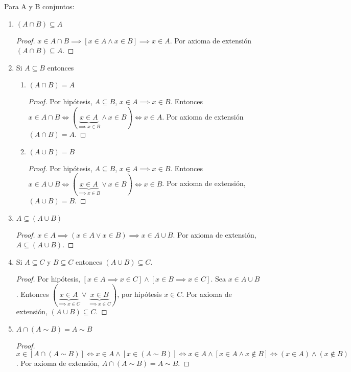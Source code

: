 





	
Para A y B conjuntos:
\begin{enumerate}
	\item $(A \cap B) \subseteq A$
	\begin{proof}
		$x\in A\cap B\implies [x\in A \wedge x \in B]\implies x\in A$. Por axioma de extensión $(A \cap B) \subseteq A$. 
	\end{proof}
	\item Si $A \subseteq B$ entonces 
	\begin{enumerate}
		\item  $(A \cap B)=A$
		\begin{proof}
			Por hipótesis, $A\subseteq B$, $x\in A\implies x\in B$. Entonces $x\in A\cap B\iff (\underbrace{x\in A}_{\implies x\in B} \wedge x \in B)\iff x\in A$. Por axioma de extensión $(A \cap B)=A$. 
		\end{proof}
		\item $(A \cup B)=B$
		\begin{proof}
			Por hipótesis, $A\subseteq B$, $x\in A\implies x\in B$. Entonces $x\in A\cup B\iff (\underbrace{x\in A}_{\implies x\in B}\vee x\in B)\iff x\in B$. Por axioma de extensión, $(A \cup B)=B$. 
		\end{proof}
	\end{enumerate}
	\item $A \subseteq(A \cup B)$
	\begin{proof}
		$x\in A\implies (x\in A\vee x \in B)\implies x\in A\cup B$. Por axioma de extensión, $A \subseteq(A \cup B)$. 
	\end{proof}
	\item Si $A \subseteq C$ y $B \subseteq C$ entonces $(A \cup B) \subseteq C$.
	\begin{proof}
		Por hipótesis, $[x\in A\implies x\in C]\wedge [x\in B\implies x\in C]$. Sea $x\in A\cup B$. Entonces $(\underbrace{x\in A}_{\implies x\in C}\vee \underbrace{x\in B}_{\implies x\in C})$, por hipótesis $x\in C$. Por axioma de extensión, $(A \cup B) \subseteq C$. 
	\end{proof}
	\item $ A \cap(A \sim B)=A \sim B$
	\begin{proof}
		$x\in [A\cap (A\sim B)]\iff x\in A  \wedge[ x \in (A\sim B)]\iff x\in A \wedge [x\in A \wedge x\not\in B]\iff (x\in A)\wedge (x\not\in B)$. Por axioma de extensión, $ A \cap(A \sim B)=A \sim B$. 

\end{proof}
\end{enumerate}
